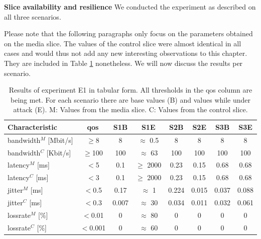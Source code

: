 \begin{description}[style=multiline, labelwidth=0.7cm]
    \item[\ref{E1}] \textbf{Slice availability and resilience} We conducted the experiment as described on all three scenarios.

    Please note that the following paragraphs only focus on the parameters obtained on the media slice. The values of the control slice were almost identical in all cases and would thus not add any new interesting observations to this chapter. They are included in Table \ref{table:validation_qos_results} nonetheless. We will now discuss the results per scenario.

    \begin{table}[ht]
        \centering
        \begin{tabular}{|l|c|c|c|c|c|c|c|}
            \hline
            \textbf{Characteristic}      & \textbf{\acrshort{qos}} & \textbf{S1B} & \textbf{S1E}  & \textbf{S2B} & \textbf{S2E} & \textbf{S3B} & \textbf{S3E} \\
            \hline
            \Gls{bandwidth}$^M$ [Mbit/s] & $\geq$8                 & 8            & $\approx$ 0.5 & 8            & 8            & 8            & 8            \\
            \Gls{bandwidth}$^C$ [Kbit/s] & $\geq$100               & 100          & $\approx$ 63  & 100          & 100          & 100          & 100          \\
            \hline
            \Gls{latency}$^M$ [ms]       & $<$5                    & 0.1          & $\geq$ 2000   & 0.23         & 0.15         & 0.68         & 0.68         \\
            \Gls{latency}$^C$ [ms]       & $<$3                    & 0.1          & $\geq$ 2000   & 0.23         & 0.15         & 0.68         & 0.68         \\
            \hline
            \Gls{jitter}$^M$ [ms]        & $<$0.5                  & 0.17         & $\approx$ 1   & 0.224        & 0.015        & 0.037        & 0.088        \\
            \Gls{jitter}$^C$ [ms]        & $<$0.3                  & 0.007        & $\approx$ 30  & 0.034        & 0.011        & 0.032        & 0.061        \\
            \hline
            \Gls{lossrate}$^M$ [\%]      & $<$0.01                 & 0            & $\approx$ 80  & 0            & 0            & 0            & 0            \\
            \Gls{lossrate}$^C$ [\%]      & $<$0.001                & 0            & $\approx$ 60  & 0            & 0            & 0            & 0            \\
            \hline
        \end{tabular}
        \caption[Results of experiment E1]{Results of experiment E1 in tabular form. All thresholds in the \acrshort{qos} column are being met. For each scenario there are base values (B) and values while under attack (E). M: Values from the media slice. C: Values from the control slice.}
        \label{table:validation_qos_results}
    \end{table}


\end{description}
